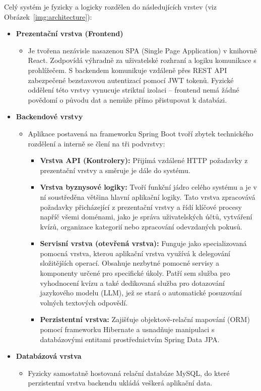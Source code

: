 \documentclass{vskpou} %
\begin{document}
Celý systém je fyzicky a logicky rozdělen do následujících vrstev (viz Obrázek~\ref{img:architecture}):

\begin{itemize}
    \item \textbf{Prezentační vrstva (Frontend)}
    \begin{itemize}
        \item Je tvořena nezávisle nasazenou SPA (Single Page Application) v knihovně React. Zodpovídá výhradně za uživatelské rozhraní a logiku komunikace s prohlížečem. S backendem komunikuje vzdáleně přes REST API zabezpečené bezstavovou autentizací pomocí JWT tokenů. Fyzické oddělení této vrstvy vynucuje striktní izolaci -- frontend nemá žádné povědomí o původu dat a nemůže přímo přistupovat k databázi.
    \end{itemize}
    \item \textbf{Backendové vrstvy}
    \begin{itemize}
        \item Aplikace postavená na frameworku Spring Boot tvoří zbytek technického rozdělení a interně se člení na tři podvrstvy:
        \begin{itemize}
            \item \textbf{Vrstva API (Kontrolery):} Přijímá vzdálené HTTP požadavky z prezentační vrstvy a směruje je dále do systému.
            \item \textbf{Vrstva byznysové logiky:} Tvoří funkční jádro celého systému a je v ní soustředěna většina hlavní aplikační logiky. Tato vrstva zpracovává požadavky přicházející z prezentační vrstvy a řídí klíčové procesy napříč všemi doménami, jako je správa uživatelských účtů, vytváření kvízů, organizace kategorií nebo zpracování odevzdaných pokusů.
            \item \textbf{Servisní vrstva (otevřená vrstva):} Funguje jako specializovaná pomocná vrstva, kterou aplikační vrstva využívá k delegování složitějších operací. Obsahuje nezbytné pomocné servisy a komponenty určené pro specifické úkoly. Patří sem služba pro vyhodnocení kvízu a také dedikovaná služba pro dotazování jazykového modelu (LLM), jež se stará o automatické posuzování volných textových odpovědí.
            \item \textbf{Perzistentní vrstva:} Zajišťuje objektově-relační mapování (ORM) pomocí frameworku Hibernate a usnadňuje manipulaci s databázovými entitami prostřednictvím Spring Data JPA.
        \end{itemize}
    \end{itemize}
    \item \textbf{Databázová vrstva}
    \begin{itemize}
        \item Fyzicky samostatně hostovaná relační databáze MySQL, do které perzistentní vrstva backendu ukládá veškerá aplikační data.
    \end{itemize}
\end{itemize}
\end{document}
